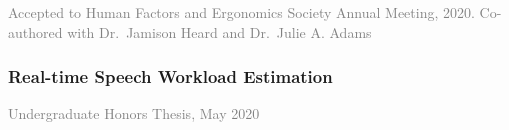\documentclass[11pt]{article} %
\renewcommand{\emph}[1]{%
  \textcolor{gray}{#1}%
}
\begin{document}
\begin{paracol}{2}
\begin{raggedright}
\emph{Accepted to Human Factors and Ergonomics Society Annual Meeting,
2020. Co-authored with Dr.~Jamison Heard and Dr.~Julie A. Adams}

\hypertarget{real-time-speech-workload-estimation}{%
\subsubsection{Real-time Speech Workload
Estimation}\label{real-time-speech-workload-estimation}}

\emph{Undergraduate Honors Thesis, May 2020}

\end{raggedright}
\end{paracol}
\end{document}
